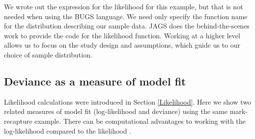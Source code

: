\documentclass[
]{krantz}
\begin{document}
We wrote out the expression for the likelihood for this example, but that is not needed when using the BUGS language. We need only specify the function name for the distribution describing our sample data. JAGS does the behind-the-scenes work to provide the code for the likelihood function. Working at a higher level allows us to focus on the study design and assumptions, which guide us to our choice of sample distribution.

\hypertarget{Deviance}{%
\subsection{Deviance as a measure of model fit}\label{Deviance}}

Likelihood calculations were introduced in Section \ref{Likelihood}. Here we show two related measures of model fit (log-likelihood and deviance) using the same mark-recapture example. There can be computational advantages to working with the log-likelihood compared to the likelihood \citep{mccarthy_2007}.
\end{document}

